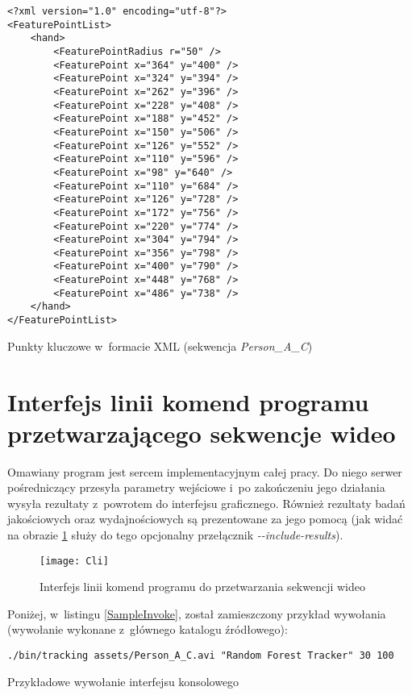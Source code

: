     \newpage
      \begin{sample}[ht]
        \begin{verbatim}
<?xml version="1.0" encoding="utf-8"?>
<FeaturePointList>
    <hand>
        <FeaturePointRadius r="50" />
        <FeaturePoint x="364" y="400" />
        <FeaturePoint x="324" y="394" />
        <FeaturePoint x="262" y="396" />
        <FeaturePoint x="228" y="408" />
        <FeaturePoint x="188" y="452" />
        <FeaturePoint x="150" y="506" />
        <FeaturePoint x="126" y="552" />
        <FeaturePoint x="110" y="596" />
        <FeaturePoint x="98" y="640" />
        <FeaturePoint x="110" y="684" />
        <FeaturePoint x="126" y="728" />
        <FeaturePoint x="172" y="756" />
        <FeaturePoint x="220" y="774" />
        <FeaturePoint x="304" y="794" />
        <FeaturePoint x="356" y="798" />
        <FeaturePoint x="400" y="790" />
        <FeaturePoint x="448" y="768" />
        <FeaturePoint x="486" y="738" />
    </hand>
</FeaturePointList>
        \end{verbatim}
        \caption{Punkty kluczowe w~formacie XML (sekwencja \textit{Person\_A\_C})}
        \label{KeypointsXml}
      \end{sample}

  \section{Interfejs linii komend programu przetwarzającego sekwencje wideo}\label{Section_CLI}
    Omawiany program jest sercem implementacyjnym całej pracy. Do niego serwer pośredniczący przesyła parametry wejściowe i~po zakończeniu jego działania wysyła rezultaty z~powrotem do interfejsu graficznego. Również rezultaty badań jakościowych oraz wydajnościowych są prezentowane za jego pomocą (jak widać na obrazie \ref{fig:Cli} służy do tego opcjonalny przełącznik \textit{-{}-include-results}).

    \newpage
    \begin{figure}[!ht]
      \centering
      \texttt{[image: Cli]}
      \caption[Interfejs linii komend programu do przetwarzania sekwencji wideo]{Interfejs linii komend programu do przetwarzania sekwencji wideo}
      \label{fig:Cli}
    \end{figure}

    Poniżej, w~listingu \ref{SampleInvoke}, został zamieszczony przykład wywołania (wywołanie wykonane z~głównego katalogu źródłowego):

    \begin{sample}[ht]
      \begin{verbatim}
./bin/tracking assets/Person_A_C.avi "Random Forest Tracker" 30 100
      \end{verbatim}
      \caption{Przykładowe wywołanie interfejsu konsolowego}
      \label{SampleInvoke}
    \end{sample}

